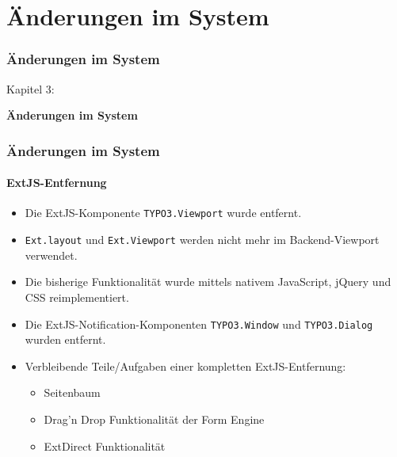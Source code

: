%

\section{Änderungen im System}
\begin{frame}[fragile]
	\frametitle{Änderungen im System}

	\begin{center}\huge{Kapitel 3:}\end{center}
	\begin{center}\huge{\color{typo3darkgrey}\textbf{Änderungen im System}}\end{center}

\end{frame}


\begin{frame}[fragile]
	\frametitle{Änderungen im System}
	\framesubtitle{ExtJS-Entfernung}

	\begin{itemize}
		\item Die ExtJS-Komponente \texttt{TYPO3.Viewport} wurde entfernt.
		\item \texttt{Ext.layout} und \texttt{Ext.Viewport} werden nicht mehr im Backend-Viewport verwendet.
		\item Die bisherige Funktionalität wurde mittels nativem JavaScript, jQuery und CSS reimplementiert.
		\item Die ExtJS-Notification-Komponenten \texttt{TYPO3.Window} und \texttt{TYPO3.Dialog} wurden entfernt.
		\item Verbleibende Teile/Aufgaben einer kompletten ExtJS-Entfernung:

		\begin{itemize}
			\item Seitenbaum
			\item Drag'n Drop Funktionalität der Form Engine
			\item ExtDirect Funktionalität
		\end{itemize}

	\end{itemize}

\end{frame}

